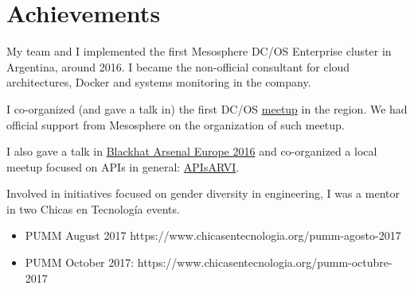 \documentclass{vitae}
\begin{document}
\section*{Achievements}
My team and I implemented the first Mesosphere DC/OS Enterprise cluster in Argentina, around 2016. I became the non-official consultant for cloud architectures, Docker and systems monitoring in the company.

I co-organized (and gave a talk in) the first DC/OS \href{https://www.meetup.com/es-ES/mesos-dcos-argentina/events/234352452/}{meetup} in the region. We had official support from Mesosphere on the organization of such meetup.

I also gave a talk in \href{https://www.blackhat.com/eu-16/presenters/Nicolas-Villanueva.html}{Blackhat Arsenal Europe 2016} and co-organized a local meetup focused on APIs in general: \href{https://www.meetup.com/es-ES/preview/APIsAR/events/243084908}{APIsARVI}.

Involved in initiatives focused on gender diversity in engineering, I was a mentor in two Chicas en Tecnología events.
\begin{itemize}
    \item PUMM August 2017 https://www.chicasentecnologia.org/pumm-agosto-2017
    \item PUMM October 2017: https://www.chicasentecnologia.org/pumm-octubre-2017
\end{itemize}
\end{document}
